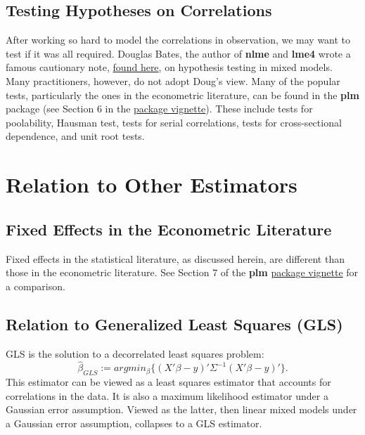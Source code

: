 \documentclass[]{book}
\theoremstyle{definition}
\theoremstyle{definition}
\theoremstyle{definition}
\theoremstyle{remark}
\begin{document}
\subsection{Testing Hypotheses on
Correlations}\label{testing-hypotheses-on-correlations}

After working so hard to model the correlations in observation, we may
want to test if it was all required. Douglas Bates, the author of
\textbf{nlme} and \textbf{lme4} wrote a famous cautionary note,
\href{https://stat.ethz.ch/pipermail/r-help/2006-May/094765.html}{found
here}, on hypothesis testing in mixed models. Many practitioners,
however, do not adopt Doug's view. Many of the popular tests,
particularly the ones in the econometric literature, can be found in the
\textbf{plm} package (see Section 6 in the
\href{https://cran.r-project.org/web/packages/plm/vignettes/plm.pdf}{package
vignette}). These include tests for poolability, Hausman test, tests for
serial correlations, tests for cross-sectional dependence, and unit root
tests.

\section{Relation to Other
Estimators}\label{relation-to-other-estimators}

\subsection{Fixed Effects in the Econometric
Literature}\label{fixed-effects-in-the-econometric-literature}

Fixed effects in the statistical literature, as discussed herein, are
different than those in the econometric literature. See Section 7 of the
\textbf{plm}
\href{https://cran.r-project.org/web/packages/plm/vignettes/plm.pdf}{package
vignette} for a comparison.

\subsection{Relation to Generalized Least Squares
(GLS)}\label{relation-to-generalized-least-squares-gls}

GLS is the solution to a decorrelated least squares problem:
\[\hat{\beta}_{GLS}:=argmin_\beta\{(X'\beta-y)'\Sigma^{-1}(X'\beta-y)'\}.\]
This estimator can be viewed as a least squares estimator that accounts
for correlations in the data. It is also a maximum likelihood estimator
under a Gaussian error assumption. Viewed as the latter, then linear
mixed models under a Gaussian error assumption, collapses to a GLS
estimator.
\end{document}
